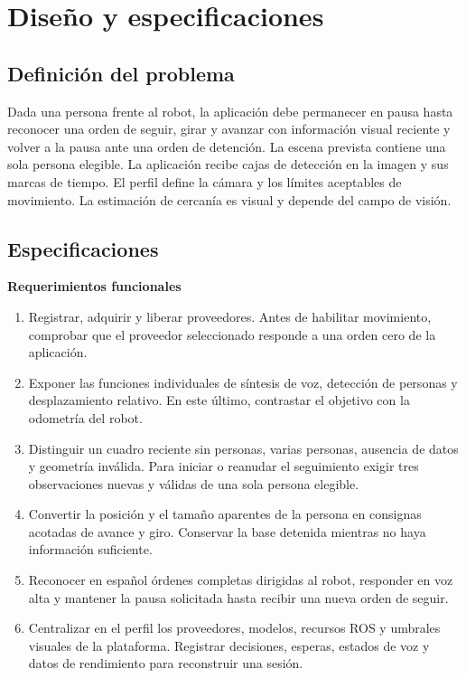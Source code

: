 \documentclass[11pt,letterpaper]{article}
\begin{document}
\clearpage
\section{Diseño y especificaciones}
\subsection{Definición del problema}
Dada una persona frente al robot, la aplicación debe permanecer en pausa hasta reconocer una orden de seguir, girar y avanzar con información visual reciente y volver a la pausa ante una orden de detención. La escena prevista contiene una sola persona elegible. La aplicación recibe cajas de detección en la imagen y sus marcas de tiempo. El perfil define la cámara y los límites aceptables de movimiento. La estimación de cercanía es visual y depende del campo de visión.

\subsection{Especificaciones}
\par\medskip\noindent\textbf{Requerimientos funcionales}\par
\begin{enumerate}[label=RF\arabic*.]
\item Registrar, adquirir y liberar proveedores. Antes de habilitar movimiento, comprobar que el proveedor seleccionado responde a una orden cero de la aplicación.
\item Exponer las funciones individuales de síntesis de voz, detección de personas y desplazamiento relativo. En este último, contrastar el objetivo con la odometría del robot.
\item Distinguir un cuadro reciente sin personas, varias personas, ausencia de datos y geometría inválida. Para iniciar o reanudar el seguimiento exigir tres observaciones nuevas y válidas de una sola persona elegible.
\item Convertir la posición y el tamaño aparentes de la persona en consignas acotadas de avance y giro. Conservar la base detenida mientras no haya información suficiente.
\item Reconocer en español órdenes completas dirigidas al robot, responder en voz alta y mantener la pausa solicitada hasta recibir una nueva orden de seguir.
\item Centralizar en el perfil los proveedores, modelos, recursos ROS y umbrales visuales de la plataforma. Registrar decisiones, esperas, estados de voz y datos de rendimiento para reconstruir una sesión.
\end{enumerate}
\end{document}
